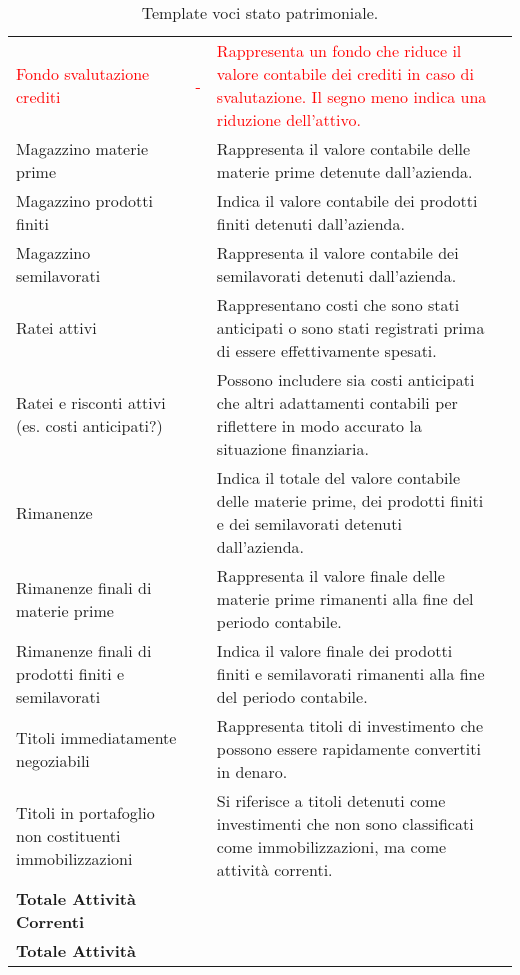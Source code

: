 \documentclass{book}
\newcommand{\FondoSvalutazioneCrediti}{Rappresenta un fondo che riduce il valore contabile dei crediti in caso di svalutazione. Il segno meno indica una riduzione dell'attivo.}
\newcommand{\MagazzinoMateriePrime}{Rappresenta il valore contabile delle materie prime detenute dall'azienda.}
\newcommand{\MagazzinoProdottiFiniti}{Indica il valore contabile dei prodotti finiti detenuti dall'azienda.}
\newcommand{\MagazzinoSemilavorati}{Rappresenta il valore contabile dei semilavorati detenuti dall'azienda.}
\newcommand{\RateiAttivi}{Rappresentano costi che sono stati anticipati o sono stati registrati prima di essere effettivamente spesati.}
\newcommand{\RateiERiscontiAttivi}{Possono includere sia costi anticipati che altri adattamenti contabili per riflettere in modo accurato la situazione finanziaria.}
\newcommand{\Rimanenze}{Indica il totale del valore contabile delle materie prime, dei prodotti finiti e dei semilavorati detenuti dall'azienda.}
\newcommand{\RimanenzeFinaliMateriePrime}{Rappresenta il valore finale delle materie prime rimanenti alla fine del periodo contabile.}
\newcommand{\RimanenzeFinaliProdottiFinitiSemilavorati}{Indica il valore finale dei prodotti finiti e semilavorati rimanenti alla fine del periodo contabile.}
\newcommand{\TitoliImmediatamenteNegoziabili}{Rappresenta titoli di investimento che possono essere rapidamente convertiti in denaro.}
\newcommand{\TitoliInPortafoglioNonImmob}{Si riferisce a titoli detenuti come investimenti che non sono classificati come immobilizzazioni, ma come attività correnti.}
\begin{document}
\begin{table}[ht]
{\begin{tabular}{|l|c|l|c|}
\textcolor{red}{Fondo svalutazione crediti}  & \textcolor{red}{-} & \textcolor{red}{\FondoSvalutazioneCrediti} & \\
Magazzino materie prime & & \MagazzinoMateriePrime & \\
Magazzino prodotti finiti & & \MagazzinoProdottiFiniti & \\
Magazzino semilavorati & & \MagazzinoSemilavorati & \\
Ratei attivi & & \RateiAttivi & \\
Ratei e risconti attivi (es. costi anticipati?) & & \RateiERiscontiAttivi & \\
Rimanenze & & \Rimanenze & \\
Rimanenze finali di materie prime & & \RimanenzeFinaliMateriePrime & \\
Rimanenze finali di prodotti finiti e semilavorati & & \RimanenzeFinaliProdottiFinitiSemilavorati & \\
Titoli immediatamente negoziabili & & \TitoliImmediatamenteNegoziabili & \\
Titoli in portafoglio non costituenti immobilizzazioni & & \TitoliInPortafoglioNonImmob & \\
\hline
\textbf{Totale Attività Correnti} & & & \\
\hline
\multicolumn{4}{|l|}{\textbf{Totale Attività}} \\
\hline
\end{tabular}
}
\caption{Template voci stato patrimoniale.}
\end{table}
\newpage
\end{document}
